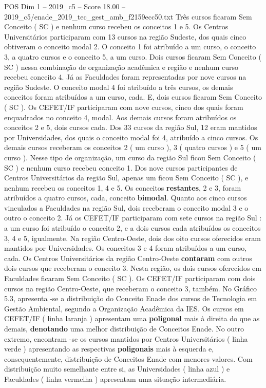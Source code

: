 \begin{textsample}{POS Dim 1 – 2019\_c5 – Score 18.00 – 2019\_c5/enade\_2019\_tec\_gest\_amb\_f2159ecc50.txt}
Três cursos ficaram Sem Conceito ( SC ) e nenhum curso recebeu os conceitos 1 e 5.
Os Centros Universitários participaram com 13 cursos na região Sudeste, dos quais cinco obtiveram o conceito modal 2.
O conceito 1 foi atribuído a um curso, o conceito 3, a quatro cursos e o conceito 5, a um curso.
Dois cursos ficaram Sem Conceito ( SC ) nessa combinação de organização acadêmica e região e nenhum curso recebeu conceito 4.
Já as Faculdades foram representadas por nove cursos na região Sudeste.
O conceito modal 4 foi atribuído a três cursos, os demais conceitos foram atribuídos a um curso, cada.
E, dois cursos ficaram Sem Conceito ( SC ).
Os CEFET/IF participaram com nove cursos, cinco dos quais foram enquadrados no conceito 4, modal.
Aos demais cursos foram atribuídos os conceitos 2 e 5, dois cursos cada.
Dos 33 cursos da região Sul, 12 eram mantidos por Universidades, dos quais o conceito modal foi 4, atribuído a cinco cursos.
Os demais cursos receberam os conceitos 2 ( um curso ), 3 ( quatro cursos ) e 5 ( um curso ).
Nesse tipo de organização, um curso da região Sul ficou Sem Conceito ( SC ) e nenhum curso recebeu conceito 1.
Dos nove cursos participantes de Centros Universitários da região Sul, apenas um ficou Sem Conceito ( SC ), e nenhum recebeu os conceitos 1, 4 e 5.
Os conceitos \textbf{restantes}, 2 e 3, foram atribuídos a quatro cursos, cada, conceito \textbf{bimodal}.
Quanto aos cinco cursos vinculados a Faculdades na região Sul, dois receberam o conceito modal 3 e o outro o conceito 2.
Já os CEFET/IF participaram com sete cursos na região Sul : a um curso foi atribuído o conceito 2, e a dois cursos cada atribuídos os conceitos 3, 4 e 5, igualmente.
Na região Centro-Oeste, dois dos oito cursos oferecidos eram mantidos por Universidades.
Os conceitos 3 e 4 foram atribuídos a um curso, cada.
Os Centros Universitários da região Centro-Oeste \textbf{contaram} com outros dois cursos que receberam o conceito 3.
Nesta região, os dois cursos oferecidos em Faculdades ficaram Sem Conceito ( SC ).
Os CEFET/IF participaram com dois cursos na região Centro-Oeste, que receberam o conceito 3, também.
No Gráfico 5.3, apresenta -se a distribuição do Conceito Enade dos cursos de Tecnologia em Gestão Ambiental, segundo a Organização Acadêmica da IES.
Os cursos em CEFET/IF ( linha laranja ) apresentam uma \textbf{poligonal} mais à direita do que as demais, \textbf{denotando} uma melhor distribuição de Conceitos Enade.
No outro extremo, encontram -se os cursos mantidos por Centros Universitários ( linha verde ) apresentando as respectivas \textbf{poligonais} mais à esquerda e, consequentemente, distribuição de Conceitos Enade com menores valores.
Com distribuição muito semelhante entre si, as Universidades ( linha azul ) e Faculdades ( linha vermelha ) apresentam uma situação intermediária.

\end{textsample}
